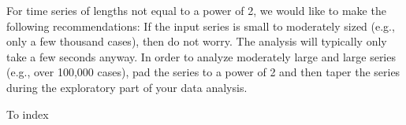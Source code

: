 For time series of lengths not equal to a power of 2, we would like to make the following recommendations: If the input series is small to moderately sized (e.g., only a few thousand cases), then do not worry. The analysis will typically only take a few seconds anyway. In order to analyze moderately large and large series (e.g., over 100,000 cases), pad the series to a power of 2 and then taper the series during the exploratory part of your data analysis.







To index
 

 

